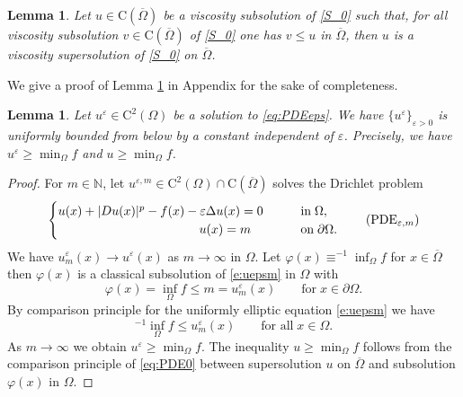 \documentclass[11pt,reqno]{amsart}
\numberwithin{figure}{section}
\theoremstyle{plain}
\newtheorem{lem}[thm]{Lemma}
\theoremstyle{remark}
\numberwithin{equation}{section}
\newcommand{\rmC}{\mathrm{C}}
\begin{document}
\begin{lem}\label{lem:max} Let $u\in \rmC(\overline{\Omega})$ be a viscosity subsolution of \eqref{S_0} such that, for all viscosity subsolution $v\in \rmC(\overline{\Omega})$ of \eqref{S_0} one has $v\leq u$ in $\overline{\Omega}$, then $u$ is a viscosity supersolution of \eqref{S_0} on $\overline{\Omega}$.
\end{lem}
\noindent We give a proof of Lemma \ref{lem:max} in Appendix for the sake of completeness. 

\begin{lem}\label{lem:lower-bound} Let $u^\varepsilon\in \mathrm{C}^2(\Omega)$ be a solution to \eqref{eq:PDEeps}. We have $\{  u^\varepsilon\}_{\varepsilon>0}$ is uniformly bounded from below by a constant independent of $\varepsilon$. Precisely, we have $  u^\varepsilon \geq \min_\Omega f$ and $  u\geq \min_\Omega f$.
\end{lem}
\begin{proof} For $m\in \mathbb{N}$, let $u^{\varepsilon,m}\in \mathrm{C}^2(\Omega)\cap \rmC(\overline{\Omega})$ solves the Drichlet problem
\begin{equation}\label{e:uepsm}
    \begin{cases}
      u(x) + |Du(x)|^p - f(x) - \varepsilon \Delta u(x) = 0 &\qquad
    \text{in}\;\Omega, \vspace{0cm}\\
    \;\qquad\quad\qquad\qquad\qquad\qquad u(x) = m &\qquad
    \text{on}\;\partial\Omega.
    \end{cases} \tag{PDE$_{\varepsilon,m}$}
\end{equation}
We have $u^{\varepsilon}_m(x) \to u^\varepsilon(x)$ as $m\to \infty$ in $\Omega$. Let $\varphi(x) \equiv  ^{-1} \inf_{\Omega} f$ for $x\in \overline{\Omega}$ then $\varphi(x)$ is a classical subsolution of \eqref{e:uepsm} in $\Omega$ with
\begin{equation*}
    \varphi(x) =   \inf_\Omega f \leq m = u^\varepsilon_m(x) \qquad\text{for}\;x\in \partial\Omega.
\end{equation*}
By comparison principle for the uniformly elliptic equation \eqref{e:uepsm} we have
\begin{equation*}
     ^{-1}\inf_\Omega f \leq u^{\varepsilon}_m(x) \qquad\text{for all}\;x\in \Omega.
\end{equation*}
As $m\to \infty$ we obtain $  u^\varepsilon \geq \min_\Omega f$. The inequality $  u\geq \min_{\Omega}f$ follows from the comparison principle of \eqref{eq:PDE0} between supersolution $u$ on $\overline{\Omega}$ and subsolution $\varphi(x)$ in $\Omega$.
\end{proof}
\end{document}
